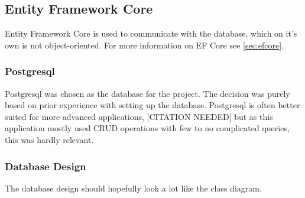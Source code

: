 \subsection{Entity Framework Core}
Entity Framework Core is used to communicate with the database, which on it's own is not object-oriented.
For more information on EF Core see \cref{sec:efcore}.
\subsubsection{Postgresql}
Postgresql was chosen as the database for the project.
The decision was purely based on prior experience with setting up the database.
Postgresql is often better suited for more advanced applications, [CITATION NEEDED] but as this application mostly used CRUD operations with few to no complicated queries, this was hardly relevant.

\subsubsection{Database Design}
The database design should hopefully look a lot like the class diagram.
